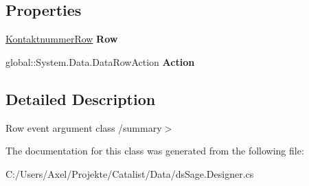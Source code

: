 \subsection*{Properties}
\begin{DoxyCompactItemize}
\item 
\hyperlink{class_products_1_1_data_1_1ds_sage_1_1_kontaktnummer_row}{Kontaktnummer\+Row} {\bfseries Row}\hypertarget{class_products_1_1_data_1_1ds_sage_1_1_kontaktnummer_row_change_event_a7aacd8312019ffa9a1db60457ee7a33c}{}\label{class_products_1_1_data_1_1ds_sage_1_1_kontaktnummer_row_change_event_a7aacd8312019ffa9a1db60457ee7a33c}

\item 
global\+::\+System.\+Data.\+Data\+Row\+Action {\bfseries Action}\hypertarget{class_products_1_1_data_1_1ds_sage_1_1_kontaktnummer_row_change_event_a004802c0388b497e51e5ba66f482b91a}{}\label{class_products_1_1_data_1_1ds_sage_1_1_kontaktnummer_row_change_event_a004802c0388b497e51e5ba66f482b91a}

\end{DoxyCompactItemize}


\subsection{Detailed Description}
Row event argument class /summary$>$ 

The documentation for this class was generated from the following file\+:\begin{DoxyCompactItemize}
\item 
C\+:/\+Users/\+Axel/\+Projekte/\+Catalist/\+Data/ds\+Sage.\+Designer.\+cs\end{DoxyCompactItemize}
